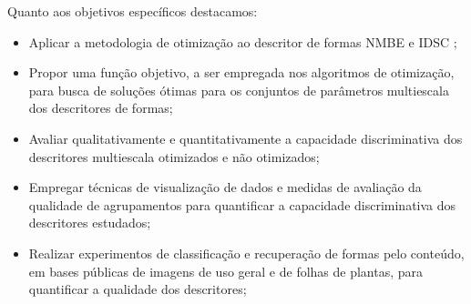 

Quanto aos objetivos específicos destacamos:

\begin{itemize}
\item Aplicar a metodologia de otimização ao descritor de formas \acf{NMBE} \cite{Costa:2009} e \acf{IDSC} \cite{1467513};

\item Propor uma função objetivo, a ser empregada nos algoritmos de otimização, para busca de soluções ótimas para os conjuntos de parâmetros multiescala dos descritores de formas;

\item Avaliar qualitativamente e quantitativamente a capacidade discriminativa dos descritores multiescala otimizados e não otimizados;

\item Empregar técnicas de visualização de dados e medidas de avaliação da qualidade de agrupamentos para quantificar a capacidade discriminativa dos descritores estudados; 

\item Realizar experimentos de classificação e recuperação de formas pelo conteúdo, em bases públicas de imagens de uso geral e de folhas de plantas, para quantificar a qualidade dos descritores;

\end{itemize}



